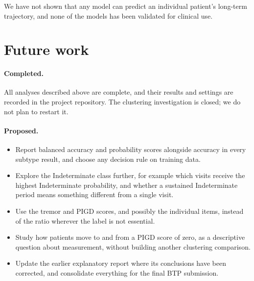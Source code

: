 \documentclass[11pt,a4paper]{article}
\begin{document}
We have not shown that any model can predict an individual patient's long-term
trajectory, and none of the models has been validated for clinical use.

\section{Future work}

\paragraph{Completed.} All analyses described above are complete, and their
results and settings are recorded in the project repository. The clustering
investigation is closed; we do not plan to restart it.

\paragraph{Proposed.}
\begin{itemize}
  \item Report balanced accuracy and probability scores alongside accuracy in
        every subtype result, and choose any decision rule on training data.
  \item Explore the Indeterminate class further, for example which visits receive
        the highest Indeterminate probability, and whether a sustained
        Indeterminate period means something different from a single visit.
  \item Use the tremor and PIGD scores, and possibly the individual items,
        instead of the ratio wherever the label is not essential.
  \item Study how patients move to and from a PIGD score of zero, as a
        descriptive question about measurement, without building another
        clustering comparison.
  \item Update the earlier explanatory report where its conclusions have been
        corrected, and consolidate everything for the final BTP submission.
\end{itemize}
\end{document}

